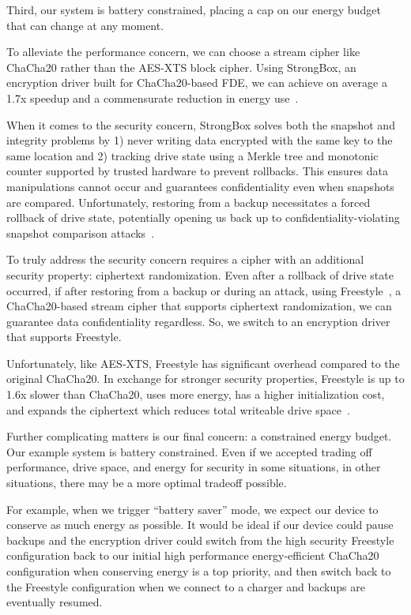 Third, our system is battery constrained, placing a cap on our energy budget
that can change at any moment.

To alleviate the performance concern, we can choose a stream cipher like
ChaCha20 rather than the AES-XTS block cipher. Using StrongBox, an encryption
driver built for ChaCha20-based FDE, we can achieve on average a 1.7x speedup
and a commensurate reduction in energy use~\cite{StrongBox}.

When it comes to the security concern, StrongBox solves both the snapshot and
integrity problems by 1) never writing data encrypted with the same key to the
same location and 2) tracking drive state using a Merkle tree and monotonic
counter supported by trusted hardware to prevent rollbacks. This ensures data
manipulations cannot occur and guarantees confidentiality even when snapshots
are compared. Unfortunately, restoring from a backup necessitates a forced
rollback of drive state, potentially opening us back up to
confidentiality-violating snapshot comparison attacks~\cite{StrongBox}.

To truly address the security concern requires a cipher with an additional
security property: ciphertext randomization. Even after a rollback of drive
state occurred, if after restoring from a backup or during an attack, using
Freestyle~\cite{Freestyle}, a ChaCha20-based stream cipher that supports
ciphertext randomization, we can guarantee data confidentiality regardless. So,
we switch to an encryption driver that supports Freestyle.

Unfortunately, like AES-XTS, Freestyle has significant overhead compared to the
original ChaCha20. In exchange for stronger security properties, Freestyle is up
to 1.6x slower than ChaCha20, uses more energy, has a higher initialization
cost, and expands the ciphertext which reduces total writeable drive
space~\cite{Freestyle}.

Further complicating matters is our final concern: a constrained energy budget.
Our example system is battery constrained. Even if we accepted trading off
performance, drive space, and energy for security in some situations, in other
situations, there may be a more optimal tradeoff possible.

For example, when we
trigger ``battery saver'' mode, we expect our device to conserve as much energy
as possible. It would be ideal if our device could pause backups and the encryption driver
could switch from the high security Freestyle configuration back to our initial high
performance energy-efficient ChaCha20 configuration when conserving energy is a
top priority, and then switch back to the Freestyle configuration when we connect to a charger and
backups are eventually resumed.

